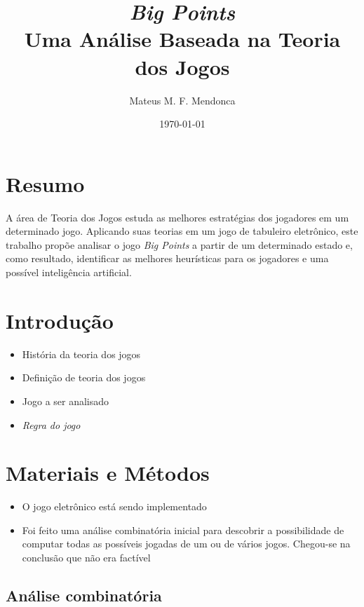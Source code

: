 \documentclass[dvipdfm, a4paper, 11pt]{article}
\begin{document}
\title{\textit{Big Points}\\Uma Análise Baseada na Teoria dos Jogos}
\author{Mateus M. F. Mendonca}
\date{\today}
\maketitle
\section{Resumo}\label{resumo}

A área de Teoria dos Jogos estuda as melhores estratégias dos jogadores
em um determinado jogo. Aplicando suas teorias em um jogo de tabuleiro
eletrônico, este trabalho propõe analisar o jogo \emph{Big Points} a
partir de um determinado estado e, como resultado, identificar as
melhores heurísticas para os jogadores e uma possível inteligência
artificial.

\section{Introdução}\label{introduuxe7uxe3o}

\begin{itemize}
\itemsep1pt\parskip0pt
\item
  História da teoria dos jogos
\item
  Definição de teoria dos jogos
\item
  Jogo a ser analisado
\item
  \emph{Regra do jogo}
\end{itemize}

\section{Materiais e Métodos}\label{materiais-e-muxe9todos}

\begin{itemize}
\itemsep1pt\parskip0pt
\item
  O jogo eletrônico está sendo implementado
\item
  Foi feito uma análise combinatória inicial para descobrir a
  possibilidade de computar todas as possíveis jogadas de um ou de
  vários jogos. Chegou-se na conclusão que não era factível
\end{itemize}

\subsection{Análise combinatória}\label{anuxe1lise-combinatuxf3ria}
\end{document}
